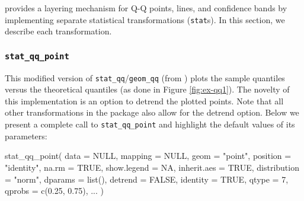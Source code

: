 \label{sec:implementing}

 provides a  layering mechanism for Q-Q
points, lines, and confidence bands by implementing separate statistical
transformations (\texttt{stat}s). In this section, we describe each
transformation.

\subsubsection{\texorpdfstring{\texttt{stat\_qq\_point}}{stat\_qq\_point}}\label{stat_qq_point}

This modified version of \texttt{stat\_qq}/\texttt{geom\_qq} (from
) plots the sample quantiles versus the theoretical
quantiles (as done in Figure \ref{fig:ex-qq1}). The novelty of this
implementation is an option to detrend the plotted points. Note that all
other transformations in the  package also allow for the
detrend option. Below we present a complete call to
\texttt{stat\_qq\_point} and highlight the default values of its
parameters:

\begin{Schunk}
\begin{Sinput}
stat_qq_point(
  data = NULL,
  mapping = NULL,
  geom = "point",
  position = "identity",
  na.rm = TRUE,
  show.legend = NA,
  inherit.aes = TRUE,
  distribution = "norm",
  dparams = list(),
  detrend = FALSE,
  identity = TRUE,
  qtype = 7,
  qprobs = c(0.25, 0.75),
  ...
  )
\end{Sinput}
\end{Schunk}

